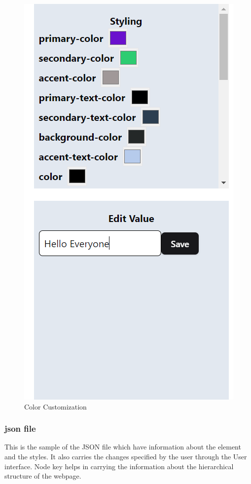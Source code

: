 \documentclass{ioereport}
\begin{document}
\begin{figure}[H]
\begin{minipage}{0.5\textwidth}
        \includegraphics[width=\linewidth, trim=0 250 0 0, clip]{images/customization 2.png}
        \caption{Color Customization}
        \label{fig:c2}
    \end{minipage}
\end{figure}


\subsubsection{\gls{json} file}
This is the sample of the JSON file which have information about the element and the styles. It also carries the changes 
specified by the user through the User interface. Node key helps in carrying the information about the hierarchical structure of the webpage.
 
\end{document}
